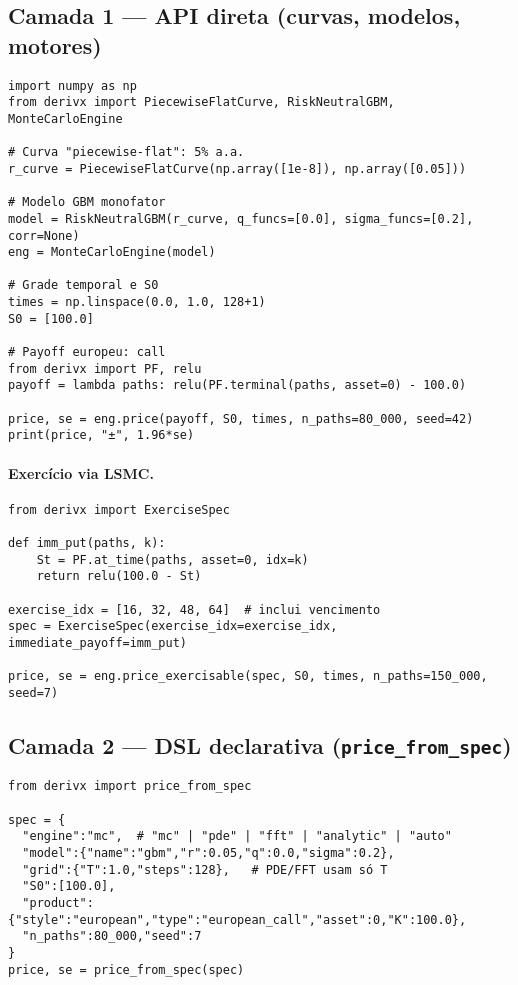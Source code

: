 \documentclass[11pt,a4paper]{article}
\begin{document}
\subsection{Camada 1 — API direta (curvas, modelos, motores)}
\begin{lstlisting}[style=pystyle]
import numpy as np
from derivx import PiecewiseFlatCurve, RiskNeutralGBM, MonteCarloEngine

# Curva "piecewise-flat": 5% a.a.
r_curve = PiecewiseFlatCurve(np.array([1e-8]), np.array([0.05]))

# Modelo GBM monofator
model = RiskNeutralGBM(r_curve, q_funcs=[0.0], sigma_funcs=[0.2], corr=None)
eng = MonteCarloEngine(model)

# Grade temporal e S0
times = np.linspace(0.0, 1.0, 128+1)
S0 = [100.0]

# Payoff europeu: call
from derivx import PF, relu
payoff = lambda paths: relu(PF.terminal(paths, asset=0) - 100.0)

price, se = eng.price(payoff, S0, times, n_paths=80_000, seed=42)
print(price, "±", 1.96*se)
\end{lstlisting}

\paragraph{Exercício via LSMC.}
\begin{lstlisting}[style=pystyle]
from derivx import ExerciseSpec

def imm_put(paths, k):
    St = PF.at_time(paths, asset=0, idx=k)
    return relu(100.0 - St)

exercise_idx = [16, 32, 48, 64]  # inclui vencimento
spec = ExerciseSpec(exercise_idx=exercise_idx, immediate_payoff=imm_put)

price, se = eng.price_exercisable(spec, S0, times, n_paths=150_000, seed=7)
\end{lstlisting}

\subsection{Camada 2 — DSL declarativa (\texttt{price\_from\_spec})}
\begin{lstlisting}[style=pystyle]
from derivx import price_from_spec

spec = {
  "engine":"mc",  # "mc" | "pde" | "fft" | "analytic" | "auto"
  "model":{"name":"gbm","r":0.05,"q":0.0,"sigma":0.2},
  "grid":{"T":1.0,"steps":128},   # PDE/FFT usam só T
  "S0":[100.0],
  "product":{"style":"european","type":"european_call","asset":0,"K":100.0},
  "n_paths":80_000,"seed":7
}
price, se = price_from_spec(spec)
\end{lstlisting}
\end{document}
